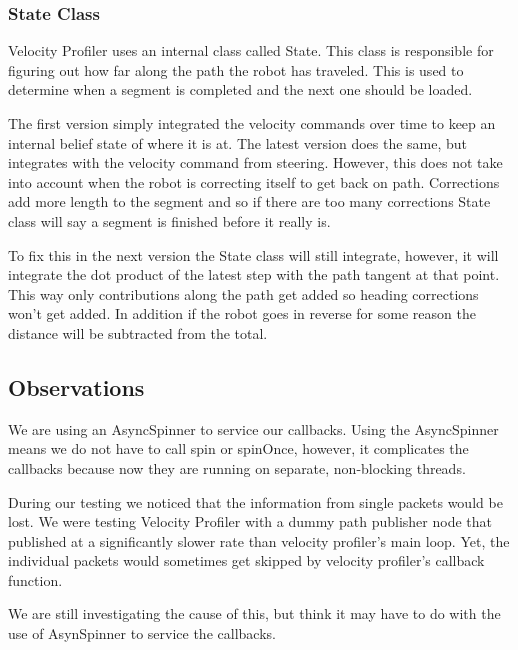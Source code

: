 \subsubsection{State Class}
Velocity Profiler uses an internal class called State.  This class is
responsible for figuring out how far along the path the robot has
traveled.  This is used to determine when a segment is completed and
the next one should be loaded.

The first version simply integrated the velocity commands over time to
keep an internal belief state of where it is at.  The latest version
does the same, but integrates with the velocity command from
steering.  However, this does not take into account when the robot is
correcting itself to get back on path.  Corrections add more length to
the segment and so if there are too many corrections State class will
say a segment is finished before it really is.

To fix this in the next version the State class will still integrate,
however, it will integrate the dot product of the latest step with the
path tangent at that point. This way only contributions along the path
get added so heading corrections won't get added.  In addition if the
robot goes in reverse for some reason the distance will be subtracted
from the total.

\subsection{Observations}

We are using an AsyncSpinner to service our callbacks.  Using the
AsyncSpinner means we do not have to call spin or spinOnce, however,
it complicates the callbacks because now they are running on separate,
non-blocking threads.

During our testing we noticed that the information from single packets
would be lost.  We were testing Velocity Profiler with a dummy path
publisher node that published at a significantly slower rate than
velocity profiler's main loop.  Yet, the individual packets would
sometimes get skipped by velocity profiler's callback function.

We are still investigating the cause of this, but think it may have to
do with the use of AsynSpinner to service the callbacks.